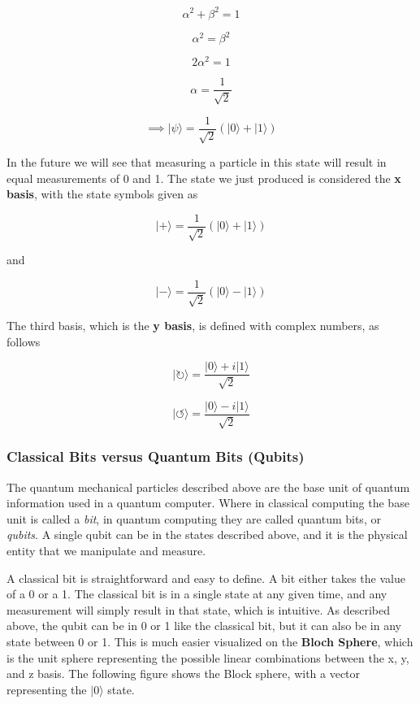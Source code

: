 \documentclass[11pt]{article}
\begin{document}
\[\alpha^2 + \beta^2 = 1\]

\[\alpha^2 = \beta^2\]

\[2\alpha^2 = 1\]

\[\alpha = \frac{1}{\sqrt{2}}\]

\[\implies |\psi\rangle = \frac{1}{\sqrt{2}}(|0\rangle + |1\rangle)\]

In the future we will see that measuring a particle in this state will
result in equal measurements of 0 and 1. The state we just produced is
considered the \textbf{x basis}, with the state symbols given as

\[|+\rangle = \frac{1}{\sqrt{2}}(|0\rangle + |1\rangle)\]

and

\[|-\rangle = \frac{1}{\sqrt{2}}(|0\rangle - |1\rangle)\]

The third basis, which is the \textbf{y basis}, is defined with complex
numbers, as follows

\[|\circlearrowright\rangle = \frac{ | 0 \rangle + i | 1 \rangle}{\sqrt{2}}\]

\[|\circlearrowleft\rangle = \frac{ | 0 \rangle -i | 1 \rangle}{\sqrt{2}}\]

    \subsubsection{Classical Bits versus Quantum Bits
(Qubits)}\label{classical-bits-versus-quantum-bits-qubits}

    The quantum mechanical particles described above are the base unit of
quantum information used in a quantum computer. Where in classical
computing the base unit is called a \emph{bit}, in quantum computing
they are called quantum bits, or \emph{qubits}. A single qubit can be in
the states described above, and it is the physical entity that we
manipulate and measure.

A classical bit is straightforward and easy to define. A bit either
takes the value of a 0 or a 1. The classical bit is in a single state at
any given time, and any measurement will simply result in that state,
which is intuitive. As described above, the qubit can be in 0 or 1 like
the classical bit, but it can also be in any state between 0 or 1. This
is much easier visualized on the \textbf{Bloch Sphere}, which is the
unit sphere representing the possible linear combinations between the x,
y, and z basis. The following figure shows the Block sphere, with a
vector representing the \(|0\rangle\) state.
\end{document}

